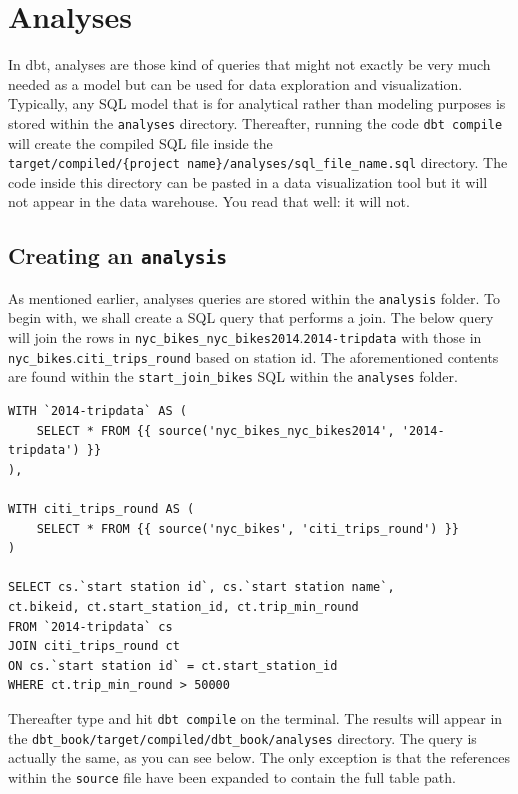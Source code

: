 \documentclass[
]{book}
\begin{document}
\hypertarget{analyses}{%
\chapter{Analyses}\label{analyses}}

In dbt, analyses are those kind of queries that might not exactly be very much needed as a model but can be used for data exploration and visualization. Typically, any SQL model that is for analytical rather than modeling purposes is stored within the \texttt{analyses} directory. Thereafter, running the code \texttt{dbt\ compile} will create the compiled SQL file inside the \texttt{target/compiled/\{project\ name\}/analyses/sql\_file\_name.sql} directory. The code inside this directory can be pasted in a data visualization tool but it will not appear in the data warehouse. You read that well: it will not.

\hypertarget{creating-an-analysis}{%
\section{\texorpdfstring{Creating an \texttt{analysis}}{Creating an analysis}}\label{creating-an-analysis}}

As mentioned earlier, analyses queries are stored within the \texttt{analysis} folder. To begin with, we shall create a SQL query that performs a join. The below query will join the rows in \texttt{nyc\_bikes\_nyc\_bikes2014}.\texttt{2014-tripdata} with those in \texttt{nyc\_bikes}.\texttt{citi\_trips\_round} based on station id. The aforementioned contents are found within the \texttt{start\_join\_bikes} SQL within the \texttt{analyses} folder.

\begin{verbatim}
WITH `2014-tripdata` AS (
    SELECT * FROM {{ source('nyc_bikes_nyc_bikes2014', '2014-tripdata') }}
), 

WITH citi_trips_round AS (
    SELECT * FROM {{ source('nyc_bikes', 'citi_trips_round') }}
)

SELECT cs.`start station id`, cs.`start station name`, 
ct.bikeid, ct.start_station_id, ct.trip_min_round 
FROM `2014-tripdata` cs 
JOIN citi_trips_round ct 
ON cs.`start station id` = ct.start_station_id
WHERE ct.trip_min_round > 50000
\end{verbatim}

Thereafter type and hit \texttt{dbt\ compile} on the terminal. The results will appear in the \texttt{dbt\_book/target/compiled/dbt\_book/analyses} directory. The query is actually the same, as you can see below. The only exception is that the references within the \texttt{source} file have been expanded to contain the full table path.
\end{document}
